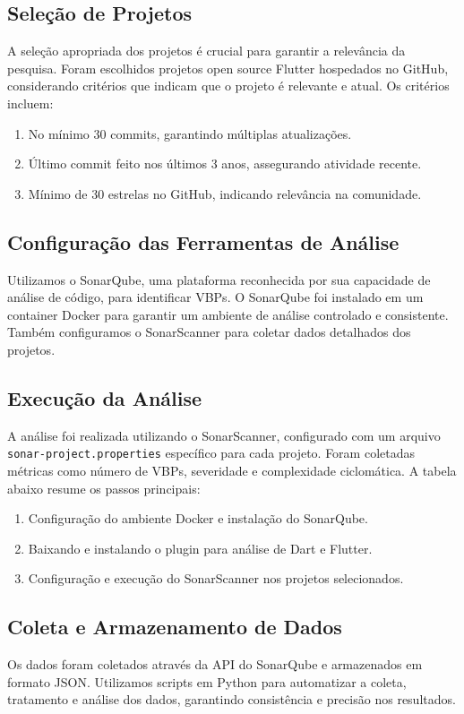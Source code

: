 \documentclass[12pt]{article}
\begin{document}
\subsection{Seleção de Projetos}
A seleção apropriada dos projetos é crucial para garantir a relevância da pesquisa. Foram escolhidos projetos open source Flutter hospedados no GitHub, considerando critérios que indicam que o projeto é relevante e atual. Os critérios incluem:
\begin{enumerate}
    \item No mínimo 30 commits, garantindo múltiplas atualizações.
    \item Último commit feito nos últimos 3 anos, assegurando atividade recente.
    \item Mínimo de 30 estrelas no GitHub, indicando relevância na comunidade.
\end{enumerate}

\subsection{Configuração das Ferramentas de Análise}
Utilizamos o SonarQube, uma plataforma reconhecida por sua capacidade de análise de código, para identificar VBPs. O SonarQube foi instalado em um container Docker para garantir um ambiente de análise controlado e consistente. Também configuramos o SonarScanner para coletar dados detalhados dos projetos.

\subsection{Execução da Análise}
A análise foi realizada utilizando o SonarScanner, configurado com um arquivo \texttt{sonar-project.properties} específico para cada projeto. Foram coletadas métricas como número de VBPs, severidade e complexidade ciclomática. A tabela abaixo resume os passos principais:
\begin{enumerate}
    \item Configuração do ambiente Docker e instalação do SonarQube.
    \item Baixando e instalando o plugin para análise de Dart e Flutter.
    \item Configuração e execução do SonarScanner nos projetos selecionados.
\end{enumerate}

\subsection{Coleta e Armazenamento de Dados}
Os dados foram coletados através da API do SonarQube e armazenados em formato JSON. Utilizamos scripts em Python para automatizar a coleta, tratamento e análise dos dados, garantindo consistência e precisão nos resultados.
\end{document}
